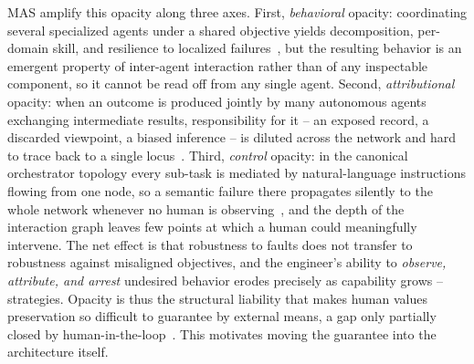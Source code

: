\documentclass[sigconf,nonacm]{acmart}
\begin{document}
MAS amplify this opacity along three axes. First, \textit{behavioral} opacity: coordinating several specialized agents under a shared objective yields decomposition, per-domain skill, and resilience to localized failures~\cite{hong2023metagpt}, but the resulting behavior is an emergent property of inter-agent interaction rather than of any inspectable component, so it cannot be read off from any single agent.
Second, \textit{attributional} opacity: when an outcome is produced jointly by many autonomous agents exchanging intermediate results, responsibility for it -- an exposed record, a discarded viewpoint, a biased inference -- is diluted across the network and hard to trace back to a single locus~\cite{chan2023harms,li2025123}.
Third, \textit{control} opacity: in the canonical orchestrator topology every sub-task is mediated by natural-language instructions flowing from one node, so a semantic failure there propagates silently to the whole network whenever no human is
observing~\cite{greshake2023not}, and the depth of the interaction graph leaves few points at which a human could meaningfully intervene.
The net effect is that robustness to faults does not transfer to robustness against misaligned objectives, and the engineer's ability to \textit{observe, attribute, and arrest} undesired behavior erodes precisely as capability grows -- strategies.
Opacity is thus the structural liability that makes human values preservation so difficult to guarantee by external means, a gap only partially closed by human-in-the-loop~\cite{mosqueira-rey2023humanintheloop}. This motivates moving the guarantee into the architecture itself.
\end{document}
